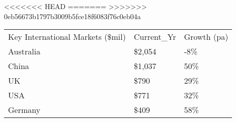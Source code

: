 <<<<<<< HEAD
=======
>>>>>>> 0eb56673b1797b3009b5fce18f6083f76c0eb04a
\begin{tabular}[t]{p{5.4cm}p{0.9cm}p{1.2cm}}
 Key International Markets (\$mil) & Current\_Yr & Growth (pa) \\ 
 Australia & \$2,054 & -8\% \\ 
  China & \$1,037 & 50\% \\ 
  UK & \$790   & 29\% \\ 
  USA & \$771   & 32\% \\ 
  Germany & \$409   & 58\% \\ 
  \end{tabular}
